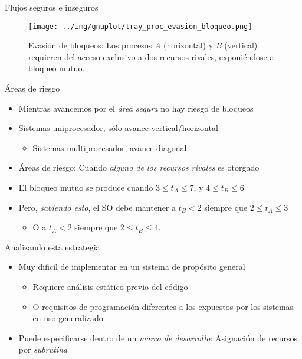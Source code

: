 \documentclass[presentation]{beamer}
\begin{document}
\begin{frame}[label={sec:orga86016c}]{Flujos seguros e inseguros}
\begin{figure}[htbp]
\centering
\texttt{[image: ../img/gnuplot/tray\_proc\_evasion\_bloqueo.png]}
\caption{Evasión de bloqueos: Los procesos \emph{A} (horizontal) y \emph{B} (vertical) requieren del acceso exclusivo a dos recursos rivales, exponiéndose a bloqueo mutuo.}
\end{figure}
\end{frame}

\begin{frame}[label={sec:org5109055}]{Áreas de riesgo}
\begin{itemize}
\item Mientras avancemos por el \emph{área segura} no hay riesgo de bloqueos
\item Sistemas uniprocesador, sólo avance vertical/horizontal
\begin{itemize}
\item Sistemas multiprocesador, avance diagonal
\end{itemize}
\item Áreas de riesgo: Cuando \emph{alguno de los recursos rivales} es otorgado
\item El bloqueo mutuo se produce cuando \(3 \le t_A \le 7\), y \(4 \le t_B
  \le 6\)
\item Pero, \emph{sabiendo esto}, el SO debe mantener a \(t_B < 2\) siempre que
\(2 \le t_A \le 3\)
\begin{itemize}
\item O a \(t_A < 2\) siempre que \(2 \le t_B \le 4\).
\end{itemize}
\end{itemize}
\end{frame}

\begin{frame}[label={sec:org5f619ec}]{Analizando esta estrategia}
\begin{itemize}
\item Muy dificil de implementar en un sistema de propósito general
\begin{itemize}
\item Requiere análisis estático previo del código
\item O requisitos de programación diferentes a los expuestos por los
sistemas en uso generalizado
\end{itemize}
\item Puede especificarse dentro de un \emph{marco de desarrollo}: Asignación
de recursos por \emph{subrutina}
\end{itemize}
\end{frame}
\end{document}
